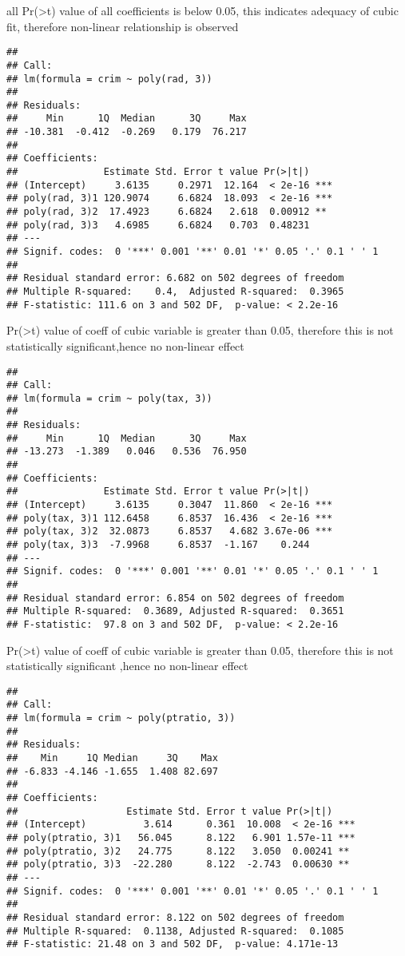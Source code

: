 \documentclass[
]{article}
\begin{document}
all Pr(\textgreater\textbar t\textbar) value of all coefficients is
below 0.05, this indicates adequacy of cubic fit, therefore non-linear
relationship is observed

\begin{verbatim}
## 
## Call:
## lm(formula = crim ~ poly(rad, 3))
## 
## Residuals:
##     Min      1Q  Median      3Q     Max 
## -10.381  -0.412  -0.269   0.179  76.217 
## 
## Coefficients:
##               Estimate Std. Error t value Pr(>|t|)    
## (Intercept)     3.6135     0.2971  12.164  < 2e-16 ***
## poly(rad, 3)1 120.9074     6.6824  18.093  < 2e-16 ***
## poly(rad, 3)2  17.4923     6.6824   2.618  0.00912 ** 
## poly(rad, 3)3   4.6985     6.6824   0.703  0.48231    
## ---
## Signif. codes:  0 '***' 0.001 '**' 0.01 '*' 0.05 '.' 0.1 ' ' 1
## 
## Residual standard error: 6.682 on 502 degrees of freedom
## Multiple R-squared:    0.4,  Adjusted R-squared:  0.3965 
## F-statistic: 111.6 on 3 and 502 DF,  p-value: < 2.2e-16
\end{verbatim}

Pr(\textgreater\textbar t\textbar) value of coeff of cubic variable is
greater than 0.05, therefore this is not statistically significant,hence
no non-linear effect

\begin{verbatim}
## 
## Call:
## lm(formula = crim ~ poly(tax, 3))
## 
## Residuals:
##     Min      1Q  Median      3Q     Max 
## -13.273  -1.389   0.046   0.536  76.950 
## 
## Coefficients:
##               Estimate Std. Error t value Pr(>|t|)    
## (Intercept)     3.6135     0.3047  11.860  < 2e-16 ***
## poly(tax, 3)1 112.6458     6.8537  16.436  < 2e-16 ***
## poly(tax, 3)2  32.0873     6.8537   4.682 3.67e-06 ***
## poly(tax, 3)3  -7.9968     6.8537  -1.167    0.244    
## ---
## Signif. codes:  0 '***' 0.001 '**' 0.01 '*' 0.05 '.' 0.1 ' ' 1
## 
## Residual standard error: 6.854 on 502 degrees of freedom
## Multiple R-squared:  0.3689, Adjusted R-squared:  0.3651 
## F-statistic:  97.8 on 3 and 502 DF,  p-value: < 2.2e-16
\end{verbatim}

Pr(\textgreater\textbar t\textbar) value of coeff of cubic variable is
greater than 0.05, therefore this is not statistically significant
,hence no non-linear effect

\begin{verbatim}
## 
## Call:
## lm(formula = crim ~ poly(ptratio, 3))
## 
## Residuals:
##    Min     1Q Median     3Q    Max 
## -6.833 -4.146 -1.655  1.408 82.697 
## 
## Coefficients:
##                   Estimate Std. Error t value Pr(>|t|)    
## (Intercept)          3.614      0.361  10.008  < 2e-16 ***
## poly(ptratio, 3)1   56.045      8.122   6.901 1.57e-11 ***
## poly(ptratio, 3)2   24.775      8.122   3.050  0.00241 ** 
## poly(ptratio, 3)3  -22.280      8.122  -2.743  0.00630 ** 
## ---
## Signif. codes:  0 '***' 0.001 '**' 0.01 '*' 0.05 '.' 0.1 ' ' 1
## 
## Residual standard error: 8.122 on 502 degrees of freedom
## Multiple R-squared:  0.1138, Adjusted R-squared:  0.1085 
## F-statistic: 21.48 on 3 and 502 DF,  p-value: 4.171e-13
\end{verbatim}
\end{document}
